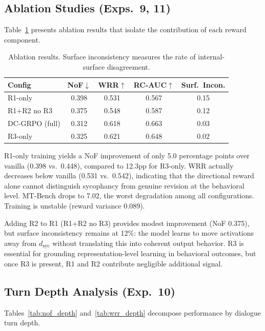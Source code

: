 \documentclass[11pt,a4paper]{article}
\newcommand{\dsyc}{$d_{\text{syc}}$}
\begin{document}
\subsection{Ablation Studies (Exps.\ 9, 11)}
\label{sec:ablation}

Table~\ref{tab:ablation} presents ablation results that isolate the contribution of each reward component.

\begin{table}[h]
\centering
\small
\caption{Ablation results. Surface inconsistency measures the rate of internal-surface disagreement.}
\label{tab:ablation}
\begin{tabular}{lcccc}
\toprule
Config & NoF$\downarrow$ & WRR$\uparrow$ & RC-AUC$\uparrow$ & Surf.\ Incon. \\
\midrule
R1-only       & 0.398 & 0.531 & 0.567 & 0.15 \\
R1+R2 no R3   & 0.375 & 0.548 & 0.587 & 0.12 \\
DC-GRPO (full)& 0.312 & 0.618 & 0.663 & 0.03 \\
R3-only       & 0.325 & 0.621 & 0.648 & 0.02 \\
\bottomrule
\end{tabular}
\end{table}

R1-only training yields a NoF improvement of only 5.0 percentage points over vanilla (0.398 vs.\ 0.448), compared to 12.3pp for R3-only. WRR actually decreases below vanilla (0.531 vs.\ 0.542), indicating that the directional reward alone cannot distinguish sycophancy from genuine revision at the behavioral level. MT-Bench drops to 7.02, the worst degradation among all configurations. Training is unstable (reward variance 0.089).

Adding R2 to R1 (R1+R2 no R3) provides modest improvement (NoF 0.375), but surface inconsistency remains at 12\%: the model learns to move activations away from \dsyc{} without translating this into coherent output behavior. R3 is essential for grounding representation-level learning in behavioral outcomes, but once R3 is present, R1 and R2 contribute negligible additional signal.

\subsection{Turn Depth Analysis (Exp.\ 10)}
\label{sec:turn_depth}

Tables~\ref{tab:nof_depth} and~\ref{tab:wrr_depth} decompose performance by dialogue turn depth.
\end{document}
